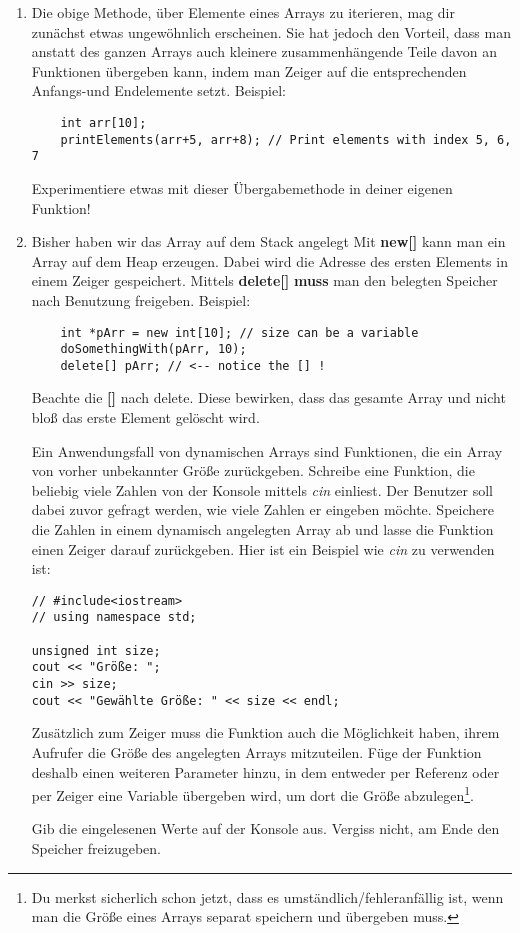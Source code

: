 \begin{enumerate}
\item 
Die obige Methode, über Elemente eines Arrays zu iterieren, mag dir zunächst etwas ungewöhnlich erscheinen.
Sie hat jedoch den Vorteil, dass man anstatt des ganzen Arrays auch kleinere zusammenhängende Teile davon an Funktionen übergeben kann, indem man Zeiger auf die entsprechenden Anfangs-und Endelemente setzt.
Beispiel:
\begin{lstlisting}
	int arr[10];
	printElements(arr+5, arr+8); // Print elements with index 5, 6, 7
\end{lstlisting}
Experimentiere etwas mit dieser Übergabemethode in deiner eigenen Funktion!

\item
Bisher haben wir das Array auf dem Stack angelegt
Mit \textbf{new[]} kann man ein Array auf dem Heap erzeugen.
Dabei wird die Adresse des ersten Elements in einem Zeiger gespeichert.
Mittels \textbf{delete[]} \textbf{muss} man den belegten Speicher nach Benutzung freigeben.
Beispiel:
\begin{lstlisting}
	int *pArr = new int[10]; // size can be a variable
	doSomethingWith(pArr, 10);
	delete[] pArr; // <-- notice the [] !
\end{lstlisting}
Beachte die \textbf{[]} nach delete.
Diese bewirken, dass das gesamte Array und nicht bloß das erste Element gelöscht wird.

Ein Anwendungsfall von dynamischen Arrays sind Funktionen, die ein Array von vorher unbekannter Größe zurückgeben.
Schreibe eine Funktion, die beliebig viele Zahlen von der Konsole mittels \emph{cin} einliest.
Der Benutzer soll dabei zuvor gefragt werden, wie viele Zahlen er eingeben möchte.
Speichere die Zahlen in einem dynamisch angelegten Array ab und lasse die Funktion einen Zeiger darauf zurückgeben.
Hier ist ein Beispiel wie \emph{cin} zu verwenden ist:
\begin{lstlisting}
// #include<iostream>
// using namespace std;

unsigned int size;
cout << "Größe: ";
cin >> size;
cout << "Gewählte Größe: " << size << endl;
\end{lstlisting}

Zusätzlich zum Zeiger muss die Funktion auch die Möglichkeit haben, ihrem Aufrufer die Größe des angelegten Arrays mitzuteilen.
Füge der Funktion deshalb einen weiteren Parameter hinzu, in dem entweder per Referenz oder per Zeiger eine Variable übergeben wird, um dort die Größe abzulegen\footnote{Du merkst sicherlich schon jetzt, dass es umständlich/fehleranfällig ist, wenn man die Größe eines Arrays separat speichern und übergeben muss.}. 

Gib die eingelesenen Werte auf der Konsole aus.
Vergiss nicht, am Ende den Speicher freizugeben.
\end{enumerate}


